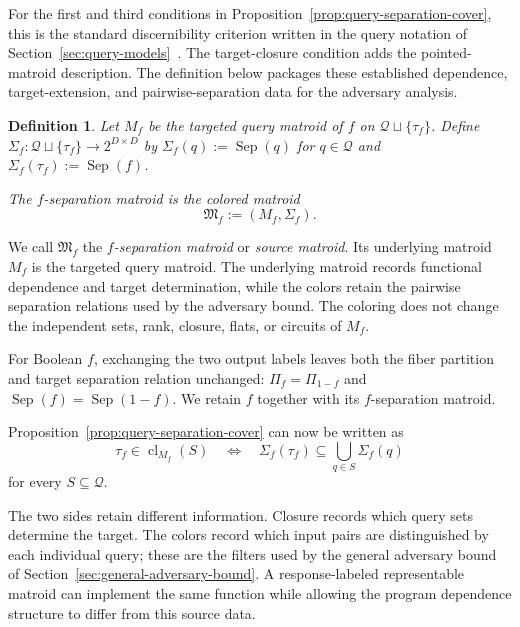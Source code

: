 \documentclass[11pt]{article}
\numberwithin{equation}{section}
\newtheorem{definition}{Definition}[section]
\theoremstyle{remark}
\newcommand{\cl}{\operatorname{cl}}
\begin{document}
For the first and third conditions in Proposition~\ref{prop:query-separation-cover}, this is the standard discernibility criterion written in the query notation of Section~\ref{sec:query-models}~\cite{SkowronRauszer1992,ChiaselottiInfusino2018}. The target-closure condition adds the pointed-matroid description. The definition below packages these established dependence, target-extension, and pairwise-separation data for the adversary analysis.

\begin{definition}
\label{def:f-separation-matroid}
Let $M_f$ be the targeted query matroid of $f$ on
$\mathcal Q\sqcup\{\tau_f\}$. Define $\Sigma_f:\mathcal Q\sqcup\{\tau_f\}\to 2^{D\times D}$ by $\Sigma_f(q):=\operatorname{Sep}(q)$ for $q\in\mathcal Q$ and
$\Sigma_f(\tau_f):=\operatorname{Sep}(f)$.

The \emph{$f$-separation matroid} is the colored matroid
\begin{equation}
    \mathfrak M_f:=(M_f,\Sigma_f).
\end{equation}
\end{definition}

We call $\mathfrak M_f$ the \emph{$f$-separation matroid} or \emph{source matroid}. Its underlying matroid $M_f$ is the targeted query matroid. The underlying matroid records functional dependence and target determination, while the colors retain the pairwise separation relations used by the adversary bound. The coloring does not change the independent sets, rank, closure, flats, or circuits of $M_f$.

For Boolean $f$, exchanging the two output labels leaves both the fiber partition and target separation relation unchanged: $\Pi_f=\Pi_{1-f}$ and $\operatorname{Sep}(f)=\operatorname{Sep}(1-f)$. We retain $f$ together with its $f$-separation matroid.

Proposition~\ref{prop:query-separation-cover} can now be written as
\begin{equation}
    \tau_f\in\cl_{M_f}(S)
    \quad\Longleftrightarrow\quad
    \Sigma_f(\tau_f)
    \subseteq
    \bigcup_{q\in S}\Sigma_f(q)
\end{equation}
for every $S\subseteq\mathcal Q$.

The two sides retain different information. Closure records which query sets determine the target. The colors record which input pairs are distinguished by each individual query; these are the filters used by the general adversary bound of Section~\ref{sec:general-adversary-bound}. A response-labeled representable matroid can implement the same function while allowing the program dependence structure to differ from this source data.
\end{document}
